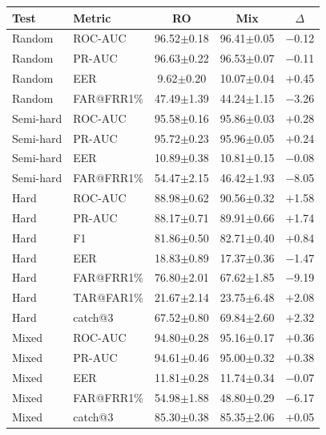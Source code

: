 \documentclass[11pt]{article}
\begin{document}
\begin{table}[!t]
\vspace{0.6em}

\begin{minipage}[t]{0.48\textwidth}
\centering
\begin{tabular}{l l c c c}
\toprule
\textbf{Test} & \textbf{Metric} & \textbf{RO} & \textbf{Mix} & \textbf{$\Delta$} \\
\midrule
Random    & ROC-AUC    & 96.52$\pm$0.18 & 96.41$\pm$0.05 & $-$0.12 \\
Random    & PR-AUC     & 96.63$\pm$0.22 & 96.53$\pm$0.07 & $-$0.11 \\
Random    & EER        & \phantom{0}9.62$\pm$0.20 & 10.07$\pm$0.04 & $+$0.45 \\
Random    & FAR@FRR1\% & 47.49$\pm$1.39 & 44.24$\pm$1.15 & $-$3.26 \\
\midrule
Semi-hard & ROC-AUC    & 95.58$\pm$0.16 & 95.86$\pm$0.03 & $+$0.28 \\
Semi-hard & PR-AUC     & 95.72$\pm$0.23 & 95.96$\pm$0.05 & $+$0.24 \\
Semi-hard & EER        & 10.89$\pm$0.38 & 10.81$\pm$0.15 & $-$0.08 \\
Semi-hard & FAR@FRR1\% & 54.47$\pm$2.15 & 46.42$\pm$1.93 & $-$8.05 \\
\midrule
Hard      & ROC-AUC    & 88.98$\pm$0.62 & 90.56$\pm$0.32 & $+$1.58 \\
Hard      & PR-AUC     & 88.17$\pm$0.71 & 89.91$\pm$0.66 & $+$1.74 \\
Hard      & F1         & 81.86$\pm$0.50 & 82.71$\pm$0.40 & $+$0.84 \\
Hard      & EER        & 18.83$\pm$0.89 & 17.37$\pm$0.36 & $-$1.47 \\
Hard      & FAR@FRR1\% & 76.80$\pm$2.01 & 67.62$\pm$1.85 & $-$9.19 \\
Hard      & TAR@FAR1\% & 21.67$\pm$2.14 & 23.75$\pm$6.48 & $+$2.08 \\
Hard      & catch@3    & 67.52$\pm$0.80 & 69.84$\pm$2.60 & $+$2.32 \\
\midrule
Mixed     & ROC-AUC    & 94.80$\pm$0.28 & 95.16$\pm$0.17 & $+$0.36 \\
Mixed     & PR-AUC     & 94.61$\pm$0.46 & 95.00$\pm$0.32 & $+$0.38 \\
Mixed     & EER        & 11.81$\pm$0.28 & 11.74$\pm$0.34 & $-$0.07 \\
Mixed     & FAR@FRR1\% & 54.98$\pm$1.88 & 48.80$\pm$0.29 & $-$6.17 \\
Mixed     & catch@3    & 85.30$\pm$0.38 & 85.35$\pm$2.06 & $+$0.05 \\

\end{tabular}
\end{minipage}
\end{table}
\end{document}
